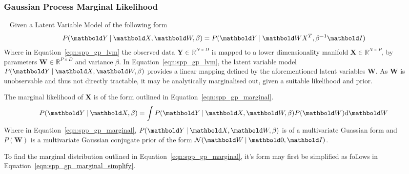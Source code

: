 \subsubsection{Gaussian Process Marginal Likelihood}
~\label{subsubsec:spp_gp_marginal_likelihood}
Given a Latent Variable Model of the following form
\begin{equation}
  \label{eqn:spp_gp_lvm}
  P(\bm{Y} \given \bm{X}, \bm{W}, \beta) = P(\bm{Y} \given \bm{WX}^{T}, \beta^{-1}\bm{I})
\end{equation}
Where in Equation~\ref{eqn:spp_gp_lvm} the observed data \(\bm{Y} \in \mathbb{R}^{N \times D}\) 
is mapped to a lower dimensionality manifold \(\bm{X} \in \mathbb{R}^{N \times P}\), by parameters 
\(\bm{W} \in \mathbb{R}^{P \times D}\) and variance \( \beta \). In Equation~\ref{eqn:spp_gp_lvm}, 
the latent variable model \( P(\bm{Y} \given \bm{X}, \bm{W}, \beta) \) provides a linear mapping 
defined by the aforementioned latent variables \( \bm{W} \). As \( \bm{W} \) is unobservable and 
thus not directly tractable, it may be analytically marginalised out, given a suitable likelihood 
and prior.

The marginal likelihood of \(\bm{X}\) is of the form outlined in Equation~\ref{eqn:spp_gp_marginal}.
\begin{equation}
  \label{eqn:spp_gp_marginal}
  P(\bm{Y} \given \bm{X}, \beta) = \int P(\bm{Y} \given \bm{X}, \bm{W}, \beta) P(\bm{W}) \intd{\bm{W}}
\end{equation}
Where in Equation~\ref{eqn:spp_gp_marginal}, \( P(\bm{Y} \given \bm{X}, \bm{W}, \beta) \) is of 
a multivariate Guassian form and \(P(\bm{W})\) is a multivariate Gaussian conjugate prior of the 
form \(\mathcal{N}(\bm{W} \given \bm{0}, \bm{I})\).

To find the marginal distribution outlined in Equation~\ref{eqn:spp_gp_marginal}, it's form may 
first be simplified as follows in Equation~\ref{eqn:spp_gp_marginal_simplify}.

